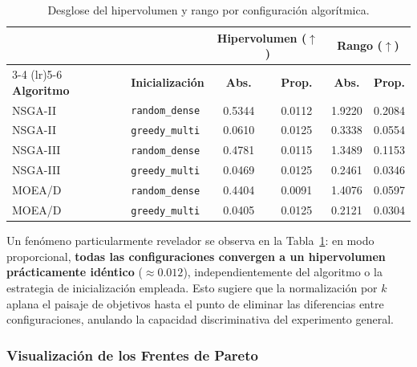 \documentclass[a4paper,10pt]{article}
\begin{document}
\begin{table}[H]
\centering
\caption{Desglose del hipervolumen y rango por configuración algorítmica.}
\label{tab:abs_vs_prop_desglose}
\begin{tabular}{l l c c c c}
\toprule
 & & \multicolumn{2}{c}{\textbf{Hipervolumen ($\uparrow$)}} & \multicolumn{2}{c}{\textbf{Rango ($\uparrow$)}} \\
\cmidrule(lr){3-4} \cmidrule(lr){5-6}
\textbf{Algoritmo} & \textbf{Inicialización} & \textbf{Abs.} & \textbf{Prop.} & \textbf{Abs.} & \textbf{Prop.} \\
\midrule
NSGA-II & \texttt{random\_dense}  & 0.5344 & 0.0112 & 1.9220 & 0.2084 \\
NSGA-II & \texttt{greedy\_multi}  & 0.0610 & 0.0125 & 0.3338 & 0.0554 \\
NSGA-III & \texttt{random\_dense} & 0.4781 & 0.0115 & 1.3489 & 0.1153 \\
NSGA-III & \texttt{greedy\_multi} & 0.0469 & 0.0125 & 0.2461 & 0.0346 \\
MOEA/D  & \texttt{random\_dense}  & 0.4404 & 0.0091 & 1.4076 & 0.0597 \\
MOEA/D  & \texttt{greedy\_multi}  & 0.0405 & 0.0125 & 0.2121 & 0.0304 \\
\bottomrule
\end{tabular}
\end{table}

Un fenómeno particularmente revelador se observa en la Tabla~\ref{tab:abs_vs_prop_desglose}: en modo proporcional, \textbf{todas las configuraciones convergen a un hipervolumen prácticamente idéntico} ($\approx 0.012$), independientemente del algoritmo o la estrategia de inicialización empleada. Esto sugiere que la normalización por $k$ aplana el paisaje de objetivos hasta el punto de eliminar las diferencias entre configuraciones, anulando la capacidad discriminativa del experimento general.

\subsubsection{Visualización de los Frentes de Pareto}
\end{document}
